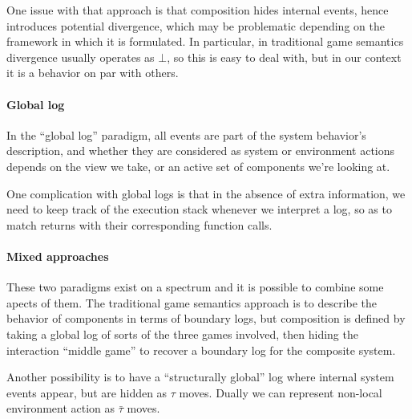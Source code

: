 \documentclass[11pt]{article}
\begin{document}
One issue with that approach is that
composition hides internal events,
hence introduces potential divergence,
which may be problematic depending on the
framework in which it is formulated.
In particular,
in traditional game semantics
divergence usually operates as $\bot$,
so this is easy to deal with,
but in our context it is a behavior on par with others.

\paragraph{Global log}

In the ``global log'' paradigm,
all events are part of the system behavior's description,
and whether they are considered as system or environment actions
depends on the view we take,
or an active set of components we're looking at.

One complication with global logs is that
in the absence of extra information,
we need to keep track of the execution stack whenever
we interpret a log,
so as to match returns with their corresponding function calls.


\paragraph{Mixed approaches}

These two paradigms exist on a spectrum and
it is possible to combine some apects of them.
The traditional game semantics approach
is to describe the behavior of components in terms of boundary logs,
but composition is defined by taking a global log of sorts
of the three games involved,
then hiding the interaction ``middle game''
to recover a boundary log for the composite system.

Another possibility is to have a ``structurally global'' log
where internal system events appear, but are hidden as $\tau$ moves.
Dually we can represent
non-local environment action as $\bar{\tau}$ moves.


\end{document}
